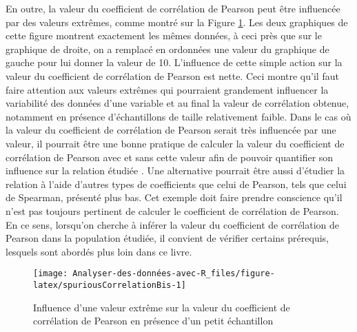 \documentclass[
  french,
]{book}
\begin{document}
En outre, la valeur du coefficient de corrélation de Pearson peut être influencée par des valeurs extrêmes, comme montré sur la Figure \ref{fig:spuriousCorrelationBis}. Les deux graphiques de cette figure montrent exactement les mêmes données, à ceci près que sur le graphique de droite, on a remplacé en ordonnées une valeur du graphique de gauche pour lui donner la valeur de 10. L'influence de cette simple action sur la valeur du coefficient de corrélation de Pearson est nette. Ceci montre qu'il faut faire attention aux valeurs extrêmes qui pourraient grandement influencer la variabilité des données d'une variable et au final la valeur de corrélation obtenue, notamment en présence d'échantillons de taille relativement faible. Dans le cas où la valeur du coefficient de corrélation de Pearson serait très influencée par une valeur, il pourrait être une bonne pratique de calculer la valeur du coefficient de corrélation de Pearson avec et sans cette valeur afin de pouvoir quantifier son influence sur la relation étudiée \autocite{halperinSpuriousCorrelationsCauses1986}. Une alternative pourrait être aussi d'étudier la relation à l'aide d'autres types de coefficients que celui de Pearson, tels que celui de Spearman, présenté plus bas. Cet exemple doit faire prendre conscience qu'il n'est pas toujours pertinent de calculer le coefficient de corrélation de Pearson. En ce sens, lorsqu'on cherche à inférer la valeur du coefficient de corrélation de Pearson dans la population étudiée, il convient de vérifier certains prérequis, lesquels sont abordés plus loin dans ce livre.

\begin{figure}

{\centering \texttt{[image: Analyser-des-données-avec-R\_files/figure-latex/spuriousCorrelationBis-1]} 

}

\caption{Influence d'une valeur extrême sur la valeur du coefficient de corrélation de Pearson en présence d'un petit échantillon}\label{fig:spuriousCorrelationBis}
\end{figure}
\end{document}
